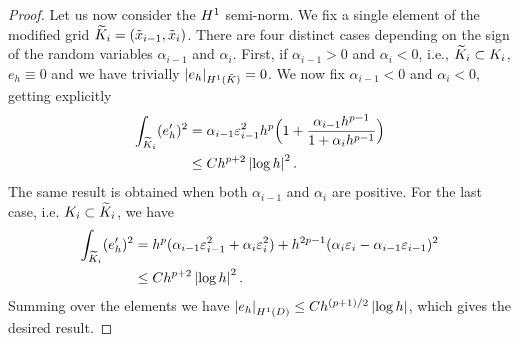 \documentclass[10pt]{article}
\begin{document}
\begin{proof}
	Let us now consider the $H^1$ semi-norm. We fix a single element of the modified grid $\widetilde K_i = (\tilde x_{i-1}, \tilde x_i)$. There are four distinct cases depending on the sign of the random variables $\alpha_{i-1}$ and $\alpha_i$. First, if $\alpha_{i-1} > 0$ and $\alpha_i < 0$, i.e., $\widetilde K_i \subset K_i$, $e_h \equiv 0$ and we have trivially $\left\lvert e_h\right\rvert_{H^1(\tilde K)} = 0$. We now fix $\alpha_{i-1} < 0$ and $\alpha_i < 0$, getting explicitly
	\begin{equation}
	\begin{aligned}
		\int_{\widetilde K_i} (e_h')^2 &= \alpha_{i-1} \varepsilon_{i-1}^2 h^p \Big(1 + \frac{\alpha_{i-1} h^{p-1}}{1 + \alpha_i h^{p-1}}\Big)\\
		&\leq C h^{p+2} \left\lvert\log h\right\rvert^2.
	\end{aligned}
	\end{equation}
	The same result is obtained when both $\alpha_{i-1}$ and $\alpha_i$ are positive. For the last case, i.e. $K_i \subset \widetilde K_i$, we have
	\begin{equation}
	\begin{aligned}
		\int_{\widetilde K_i} (e_h')^2 &= h^p(\alpha_{i-1} \varepsilon_{i-1}^2  + \alpha_i \varepsilon_i^2) + h^{2p-1}(\alpha_i \varepsilon_i - \alpha_{i-1}\varepsilon_{i-1})^2\\
		&\leq Ch^{p+2} \left\lvert\log h\right\rvert^2.
	\end{aligned}
	\end{equation}
	Summing over the elements we have $\left\lvert e_h\right\rvert_{H^1(D)} \leq Ch^{(p+1)/2} \left\lvert\log h\right\rvert$, which gives the desired result.
\end{proof}
\end{document}
